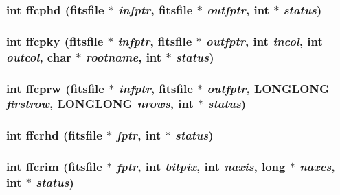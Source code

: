 \subsubsection{\setlength{\rightskip}{0pt plus 5cm}int ffcphd (\bf{fitsfile} $\ast$ {\em infptr}, \bf{fitsfile} $\ast$ {\em outfptr}, int $\ast$ {\em status})}\label{fitsio__64_8h_fa817efdc02282f5df1032b2d1b8dbaf}


\subsubsection{\setlength{\rightskip}{0pt plus 5cm}int ffcpky (\bf{fitsfile} $\ast$ {\em infptr}, \bf{fitsfile} $\ast$ {\em outfptr}, int {\em incol}, int {\em outcol}, char $\ast$ {\em rootname}, int $\ast$ {\em status})}\label{fitsio__64_8h_0f50a2acda85502df96986d85ca07b9b}


\subsubsection{\setlength{\rightskip}{0pt plus 5cm}int ffcprw (\bf{fitsfile} $\ast$ {\em infptr}, \bf{fitsfile} $\ast$ {\em outfptr}, \bf{LONGLONG} {\em firstrow}, \bf{LONGLONG} {\em nrows}, int $\ast$ {\em status})}\label{fitsio__64_8h_6c4670bf9ab97c2b092c49f122692243}


\subsubsection{\setlength{\rightskip}{0pt plus 5cm}int ffcrhd (\bf{fitsfile} $\ast$ {\em fptr}, int $\ast$ {\em status})}\label{fitsio__64_8h_edd8581511c1260a6da6ad625ce42d05}


\subsubsection{\setlength{\rightskip}{0pt plus 5cm}int ffcrim (\bf{fitsfile} $\ast$ {\em fptr}, int {\em bitpix}, int {\em naxis}, long $\ast$ {\em naxes}, int $\ast$ {\em status})}\label{fitsio__64_8h_27679e1fb1c8a2f6a85e1d9f1d4295a7}


